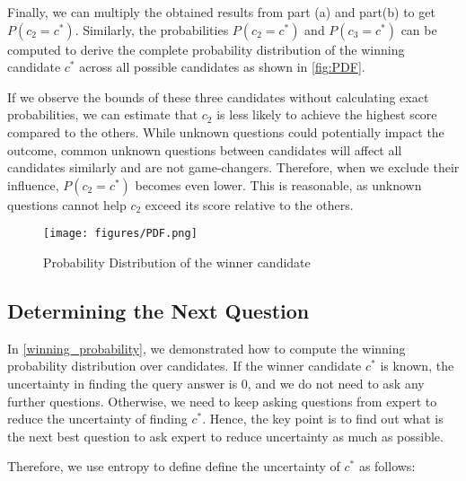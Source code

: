 \begin{example}
Finally, we can multiply the obtained  results from part (a) and part(b) to get $P(c_2 = c^*)$. Similarly, the probabilities \( P(c_2 = c^*) \) and \( P(c_3 = c^*) \) can be computed to derive the complete probability distribution of the winning candidate $c^*$ across all possible candidates as shown in \autoref{fig:PDF}.

If we observe the bounds of these three candidates without calculating exact probabilities, we can estimate that \( c_2 \) is less likely to achieve the highest score compared to the others. While unknown questions could potentially impact the outcome, common unknown questions between candidates will affect all candidates similarly and are not game-changers. Therefore, when we exclude their influence, \( P(c_2 = c^*) \) becomes even lower. This is reasonable, as unknown questions cannot help \( c_2 \) exceed its score relative to the others.

\begin{figure}[ht]
    \centering
    \texttt{[image: figures/PDF.png]}
    \caption{Probability Distribution of the winner candidate}
    \label{fig:PDF}
\end{figure}

\end{example}


\subsection{Determining the Next Question}
\label{uncertainty}




In \autoref{winning_probability}, we demonstrated how to compute the winning probability distribution over candidates. If the winner candidate $c^*$ is known, the uncertainty in finding the query answer is $0$, and we do not need to ask any further questions. Otherwise, we need to keep asking questions from expert to reduce the uncertainty of finding $c^*$. Hence, the key point is to find out what is the next best question to ask expert to reduce uncertainty as much as possible. 

Therefore, we use entropy to define define the uncertainty of $c^*$ as follows:

